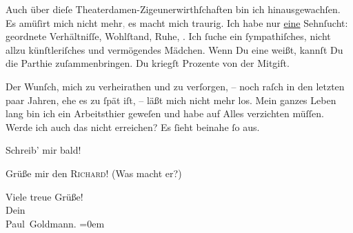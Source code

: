 \pstart
           Auch über dieſe Theaterdamen-Zigeunerwirthſchaften bin ich hinausgewachſen. Es
               amüſirt mich nicht mehr\textcolor{gray}{,} es macht mich \strikeout{\textcolor{gray}{trau}} traurig. {\pb}Ich habe nur \uline{eine} Sehnſucht: geordnete Verhältniſſe, Wohlſtand, Ruhe, \label{K_L02903-3v}\label{K_L02903-3}. Ich ſuche ein
               ſympathiſches, nicht allzu künſtleriſches und vermögendes Mädchen. Wenn Du eine
               weißt, kannſt Du die Parthie zuſammenbringen. Du kriegſt Prozente von der
               Mitgift.\pend
           
\pstart
           Der Wunſch, mich zu verheirathen und zu verſorgen, – noch raſch in den letzten paar
               Jahren, ehe es zu ſpät iſt, – läßt mich nicht mehr los. Mein ganzes Leben lang bin
               ich ein Arbeitsthier geweſen und habe auf Alles verzichten müſſen. Werde ich auch das
               nicht erreichen? Es ſieht {\pb}beinahe ſo aus.\pend
           
\pstart
           Schreib’ mir bald!\pend
           
\pstart
           Grüße mir den \textsc{Richard}! (Was macht er?)\pend
           
\pstart
           Viele treue Grüße! {\\[\baselineskip]}Dein {\\[\baselineskip]}\spacefill\mbox{Paul Goldmann.}\pend
           \leftskip=0em{}\endnumbering{}  
      